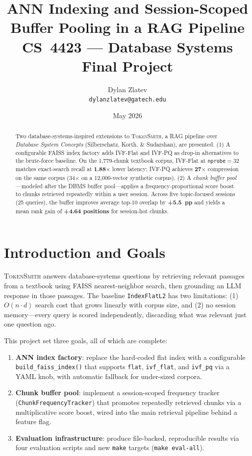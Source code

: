\documentclass[11pt,letterpaper]{article}
\title{%
  \textbf{ANN Indexing and Session-Scoped Buffer Pooling in a RAG Pipeline}\\[0.4em]
  \large CS~4423 --- Database Systems Final Project
}
\author{Dylan Zlatev \\ \texttt{dylanzlatev@gatech.edu}}
\date{May 2026}
\begin{document}
\maketitle

\begin{abstract}
Two database-systems-inspired extensions to \textsc{TokenSmith}, a RAG pipeline over
\textit{Database System Concepts} (Silberschatz, Korth, \& Sudarshan), are presented.
(1) A configurable FAISS index factory adds IVF-Flat and IVF-PQ as drop-in alternatives
to the brute-force baseline. On the 1,779-chunk textbook corpus, IVF-Flat at
\texttt{nprobe}$=32$ matches exact-search recall at \textbf{1.88$\times$} lower latency;
IVF-PQ achieves \textbf{27$\times$} compression on the same corpus (34$\times$ on a
12,000-vector synthetic corpus).
(2) A \emph{chunk buffer pool}---modeled after the DBMS buffer pool---applies a
frequency-proportional score boost to chunks retrieved repeatedly within a user session.
Across five topic-focused sessions (25 queries), the buffer improves average top-10
overlap by \textbf{+5.5~pp} and yields a mean rank gain of \textbf{+4.64 positions}
for session-hot chunks.
\end{abstract}

\section{Introduction and Goals}

\textsc{TokenSmith} answers database-systems questions by retrieving relevant passages
from a textbook using FAISS nearest-neighbor search, then grounding an LLM response in
those passages. The baseline \texttt{IndexFlatL2} has two limitations: (1) $O(n \cdot d)$
search cost that grows linearly with corpus size, and (2) no session memory---every query
is scored independently, discarding what was relevant just one question ago.

This project set three goals, all of which are complete:
\begin{enumerate}
  \item \textbf{ANN index factory}: replace the hard-coded flat index with a
    configurable \texttt{build\_faiss\_index()} that supports \texttt{flat},
    \texttt{ivf\_flat}, and \texttt{ivf\_pq} via a YAML knob, with automatic
    fallback for under-sized corpora.
  \item \textbf{Chunk buffer pool}: implement a session-scoped frequency tracker
    (\texttt{ChunkFrequencyTracker}) that promotes repeatedly retrieved chunks
    via a multiplicative score boost, wired into the main retrieval pipeline
    behind a feature flag.
  \item \textbf{Evaluation infrastructure}: produce file-backed, reproducible
    results via four evaluation scripts and new \texttt{make} targets
    (\texttt{make eval-all}).
\end{enumerate}
\end{document}

